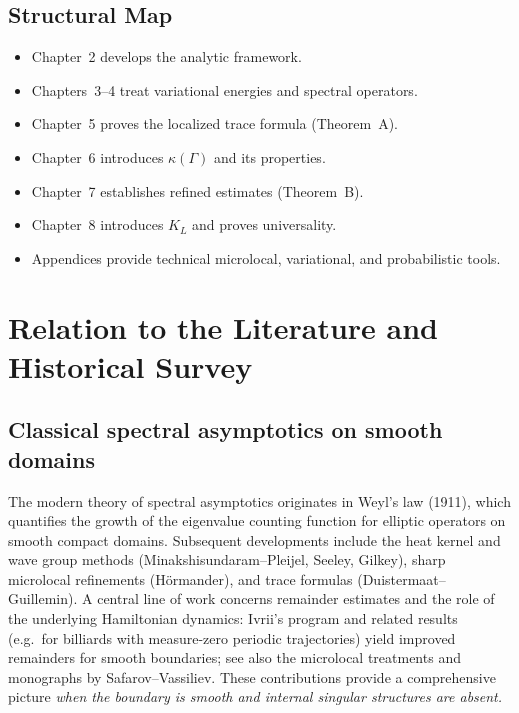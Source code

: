 \subsection{Structural Map}

\begin{itemize}
    \item Chapter~2 develops the analytic framework.
    \item Chapters~3--4 treat variational energies and spectral operators.
    \item Chapter~5 proves the localized trace formula (Theorem~A).
    \item Chapter~6 introduces $\kappa(\Gamma)$ and its properties.
    \item Chapter~7 establishes refined estimates (Theorem~B).
    \item Chapter~8 introduces $K_L$ and proves universality.
    \item Appendices provide technical microlocal, variational, and
          probabilistic tools.
\end{itemize}

\section{Relation to the Literature and Historical Survey}

\subsection*{Classical spectral asymptotics on smooth domains}
The modern theory of spectral asymptotics originates in Weyl’s law (1911), which
quantifies the growth of the eigenvalue counting function for elliptic operators on
smooth compact domains. Subsequent developments include the heat kernel and
wave group methods (Minakshisundaram--Pleijel, Seeley, Gilkey), sharp
microlocal refinements (Hörmander), and trace formulas (Duistermaat--Guillemin).
A central line of work concerns remainder estimates and the role of the underlying
Hamiltonian dynamics: Ivrii’s program and related results (e.g.\ for billiards with
measure-zero periodic trajectories) yield improved remainders for smooth boundaries;
see also the microlocal treatments and monographs by Safarov--Vassiliev.
These contributions provide a comprehensive picture \emph{when the boundary is smooth
and internal singular structures are absent.}

